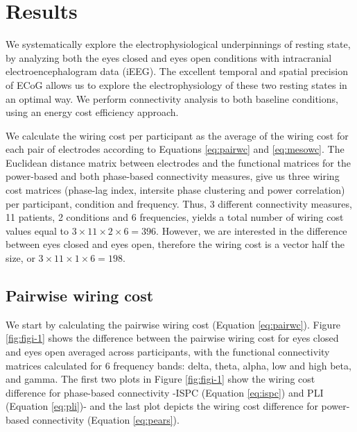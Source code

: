 \documentclass[11pt, onecolumn]{article}
\begin{document}
{%
\section{Results}
We systematically explore the electrophysiological underpinnings of resting state, by analyzing both the eyes closed and eyes open conditions with intracranial electroencephalogram data (iEEG).
The excellent temporal and spatial precision of ECoG allows us to explore the electrophysiology of these two resting states in an optimal way. 
We perform connectivity analysis to both baseline conditions, using an energy cost efficiency approach. 

We calculate the wiring cost per participant as the average of the wiring cost for each pair of electrodes according to Equations \ref{eq:pairwc} and \ref{eq:mesowc}. The Euclidean distance matrix between electrodes and the functional matrices for the power-based and both phase-based connectivity measures, give us three wiring cost matrices (phase-lag index, intersite phase clustering and power correlation) per participant, condition and frequency. Thus, 3 different connectivity measures, 11 patients, 2 conditions and 6 frequencies, yields a total number of wiring cost values equal to $3\times 11 \times 2 \times 6=396$. However, we are interested in the difference between eyes closed and eyes open, therefore  the wiring cost is a vector half the size, or $3\times 11 \times 1 \times 6=198$.

\subsection{Pairwise wiring cost}
We start by calculating the pairwise wiring cost (Equation \ref{eq:pairwc}). Figure \ref{fig:figi-1} shows the difference between the pairwise wiring cost for eyes closed and eyes open averaged across participants, with the functional connectivity matrices calculated for 6 frequency bands: delta, theta, alpha, low and high beta, and gamma. 
The first two plots in Figure \ref{fig:figi-1} show the wiring cost difference for phase-based connectivity -ISPC (Equation \ref{eq:ispc}) and PLI (Equation \ref{eq:pli})- and the last plot depicts the wiring cost difference for power-based connectivity (Equation \ref{eq:pears}).
 
}
\end{document}
